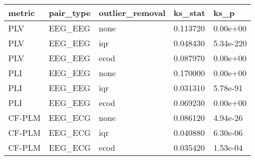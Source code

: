 \begin{tabular}{lllll}
\toprule
metric & pair\_type & outlier\_removal & ks\_stat & ks\_p \\
\midrule
PLV & EEG\_EEG & none & 0.113720 & 0.00e+00 \\
PLV & EEG\_EEG & iqr & 0.048430 & 5.34e-220 \\
PLV & EEG\_EEG & ecod & 0.087970 & 0.00e+00 \\
PLI & EEG\_EEG & none & 0.170000 & 0.00e+00 \\
PLI & EEG\_EEG & iqr & 0.031310 & 5.78e-91 \\
PLI & EEG\_EEG & ecod & 0.069230 & 0.00e+00 \\
CF-PLM & EEG\_ECG & none & 0.086120 & 4.94e-26 \\
CF-PLM & EEG\_ECG & iqr & 0.040880 & 6.30e-06 \\
CF-PLM & EEG\_ECG & ecod & 0.035420 & 1.53e-04 \\
\bottomrule
\end{tabular}
